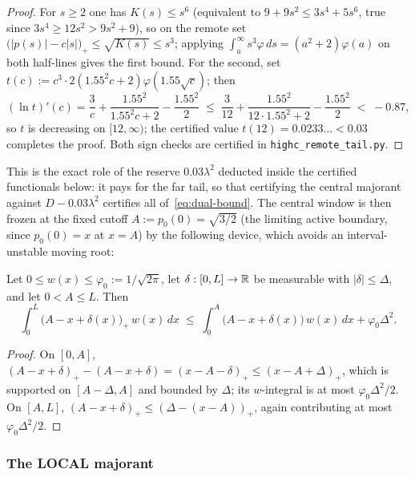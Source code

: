 \begin{proof}
For $s\ge2$ one has $K(s)\le s^6$ (equivalent to $9+9s^2\le3s^4+5s^6$, true since $3s^4\ge12s^2>9s^2+9$), so on the remote set $\bigl(|p(s)|-c|s|\bigr)_+\le\sqrt{K(s)}\le s^3$; applying $\int_a^\infty s^3\varphi\,ds=(a^2+2)\varphi(a)$ on both half-lines gives the first bound. For the second, set $t(c):=c^3\cdot2(1.55^2c+2)\varphi(1.55\sqrt c)$; then
\[
        (\ln t)'(c)=\frac3c+\frac{1.55^2}{1.55^2c+2}-\frac{1.55^2}2
        \;\le\;\frac3{12}+\frac{1.55^2}{12\cdot1.55^2+2}-\frac{1.55^2}2\;<\;-0.87,
\]
so $t$ is decreasing on $[12,\infty)$; the certified value $t(12)=0.0233\ldots<0.03$ completes the proof. Both sign checks are certified in \texttt{highc\_remote\_tail.py}.
\end{proof}

This is the exact role of the reserve $0.03\lambda^2$ deducted inside the certified functionals below: it pays for the far tail, so that certifying the central majorant against $D-0.03\lambda^2$ certifies all of~\eqref{eq:dual-bound}. The central window is then frozen at the fixed cutoff $A:=p_0(0)=\sqrt{3/2}$ (the limiting active boundary, since $p_0(0)=x$ at $x=A$) by the following device, which avoids an interval-unstable moving root:

\begin{lemma}\label{lem:moving-cutoff}
Let $0\le w(x)\le\varphi_0:=1/\sqrt{2\pi}$, let $\delta:[0,L]\to\mathbb{R}$ be measurable with $|\delta|\le\Delta$, and let $0<A\le L$. Then
\[
        \int_0^L\bigl(A-x+\delta(x)\bigr)_+\,w(x)\,dx
        \;\le\;
        \int_0^A\bigl(A-x+\delta(x)\bigr)\,w(x)\,dx+\varphi_0\Delta^2 .
\]
\end{lemma}

\begin{proof}
On $[0,A]$, $(A-x+\delta)_+-(A-x+\delta)=(x-A-\delta)_+\le(x-A+\Delta)_+$, which is supported on $[A-\Delta,A]$ and bounded by $\Delta$; its $w$-integral is at most $\varphi_0\Delta^2/2$. On $[A,L]$, $(A-x+\delta)_+\le(\Delta-(x-A))_+$, again contributing at most $\varphi_0\Delta^2/2$.
\end{proof}

\subsubsection*{The LOCAL majorant}

